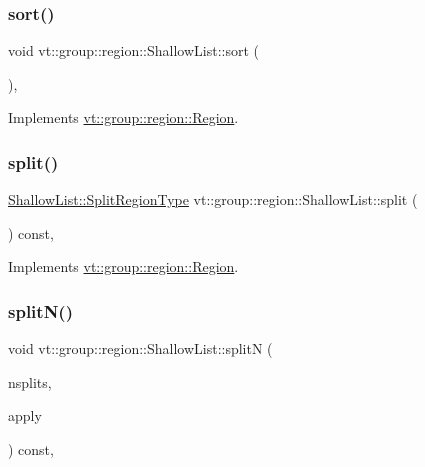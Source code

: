 \subsubsection{\texorpdfstring{sort()}{sort()}}
{\footnotesize\ttfamily void vt\+::group\+::region\+::\+Shallow\+List\+::sort (\begin{DoxyParamCaption}{ }\end{DoxyParamCaption})\hspace{0.3cm}{\ttfamily [override]}, {\ttfamily [virtual]}}



Implements \hyperlink{structvt_1_1group_1_1region_1_1_region_a169304bf82a87ff958333595bed2603d}{vt\+::group\+::region\+::\+Region}.

\mbox{\label{structvt_1_1group_1_1region_1_1_shallow_list_a766a07e9f1c8580a1b986a71bb80ea66}} 
\subsubsection{\texorpdfstring{split()}{split()}}
{\footnotesize\ttfamily \hyperlink{structvt_1_1group_1_1region_1_1_region_ab8d05c0978c7f38292a9ed5a15498a4b}{Shallow\+List\+::\+Split\+Region\+Type} vt\+::group\+::region\+::\+Shallow\+List\+::split (\begin{DoxyParamCaption}{ }\end{DoxyParamCaption}) const\hspace{0.3cm}{\ttfamily [override]}, {\ttfamily [virtual]}}



Implements \hyperlink{structvt_1_1group_1_1region_1_1_region_a2cbbbff6358f0f63235d95501858f512}{vt\+::group\+::region\+::\+Region}.

\mbox{\label{structvt_1_1group_1_1region_1_1_shallow_list_ac41946e0f130b3d4b42f9edbe20f3605}} 
\subsubsection{\texorpdfstring{split\+N()}{splitN()}}
{\footnotesize\ttfamily void vt\+::group\+::region\+::\+Shallow\+List\+::splitN (\begin{DoxyParamCaption}\item[{int}]{nsplits,  }\item[{\hyperlink{structvt_1_1group_1_1region_1_1_region_a7c9e99b1157d2fe2f3e6fc36a1463a96}{Apply\+Fn\+Type}}]{apply }\end{DoxyParamCaption}) const\hspace{0.3cm}{\ttfamily [override]}, {\ttfamily [virtual]}}



